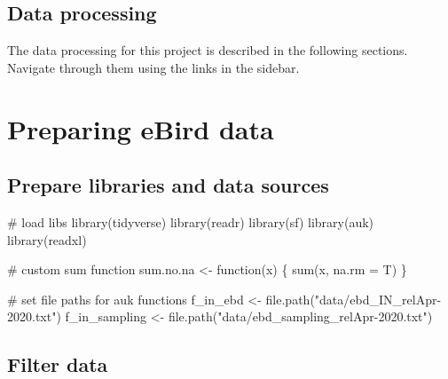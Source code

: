 \documentclass[]{article}
\newenvironment{Shaded}{}{}
\newcommand{\CommentTok}[1]{\textcolor[rgb]{0.00,0.50,0.00}{#1}}
\newcommand{\ControlFlowTok}[1]{\textcolor[rgb]{0.00,0.00,1.00}{#1}}
\newcommand{\DataTypeTok}[1]{#1}
\newcommand{\KeywordTok}[1]{\textcolor[rgb]{0.00,0.00,1.00}{#1}}
\newcommand{\NormalTok}[1]{#1}
\newcommand{\OperatorTok}[1]{#1}
\newcommand{\StringTok}[1]{\textcolor[rgb]{0.00,0.50,0.50}{#1}}
\begin{document}
\hypertarget{data-processing}{%
\subsection{Data processing}\label{data-processing}}

The data processing for this project is described in the following sections. Navigate through them using the links in the sidebar.

\hypertarget{preparing-ebird-data}{%
\section{Preparing eBird data}\label{preparing-ebird-data}}

\hypertarget{prepare-libraries-and-data-sources}{%
\subsection{Prepare libraries and data sources}\label{prepare-libraries-and-data-sources}}

\begin{Shaded}
\begin{Highlighting}[]

\CommentTok{# load libs}
\KeywordTok{library}\NormalTok{(tidyverse)}
\KeywordTok{library}\NormalTok{(readr)}
\KeywordTok{library}\NormalTok{(sf)}
\KeywordTok{library}\NormalTok{(auk)}
\KeywordTok{library}\NormalTok{(readxl)}

\CommentTok{# custom sum function}
\NormalTok{sum.no.na <-}\StringTok{ }\ControlFlowTok{function}\NormalTok{(x) \{}
  \KeywordTok{sum}\NormalTok{(x, }\DataTypeTok{na.rm =}\NormalTok{ T)}
\NormalTok{\}}

\CommentTok{# set file paths for auk functions}
\NormalTok{f_in_ebd <-}\StringTok{ }\KeywordTok{file.path}\NormalTok{(}\StringTok{"data/ebd_IN_relApr-2020.txt"}\NormalTok{)}
\NormalTok{f_in_sampling <-}\StringTok{ }\KeywordTok{file.path}\NormalTok{(}\StringTok{"data/ebd_sampling_relApr-2020.txt"}\NormalTok{)}
\end{Highlighting}
\end{Shaded}

\hypertarget{filter-data}{%
\subsection{Filter data}\label{filter-data}}

\begin{Shaded}
\end{Shaded}
\end{document}
